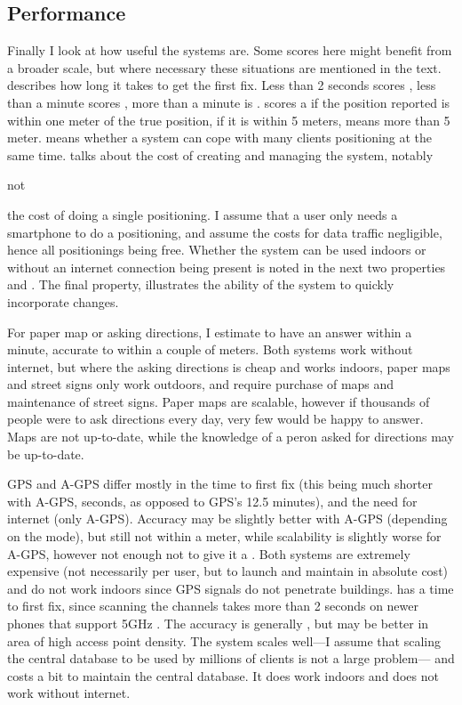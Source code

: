\subsection{Performance}
Finally I look at how useful the systems are.
Some scores here might benefit from a broader scale, but where necessary these situations are mentioned in the text.
 describes how long it takes to get the first fix.
Less than 2 seconds scores \yes, less than a minute scores \maybe, more than a minute is \no.
 scores a \yes if the position reported is within one meter of the true position, \maybe if it is within 5 meters, \no means more than 5 meter.
 means whether a system can cope with many clients positioning at the same time.
 talks about the cost of creating and managing the system, notably \begin{em}not\end{em} the cost of doing a single positioning.
I assume that a user only needs a smartphone to do a positioning, and assume the costs for data traffic negligible, hence all positionings being free.
Whether the system can be used indoors or without an internet connection being present is noted in the next two properties  and .
The final property,  illustrates the ability of the system to quickly incorporate changes.

For paper map or asking directions, I estimate to have an answer within a minute, accurate to within a couple of meters.
Both systems work without internet, but where the asking directions is cheap and works indoors, paper maps and street signs only work outdoors, and require purchase of maps and maintenance of street signs.
Paper maps are scalable, however if thousands of people were to ask directions every day, very few would be happy to answer.
Maps are not up-to-date, while the knowledge of a peron asked for directions may be up-to-date.

GPS and A-GPS differ mostly in the time to first fix (this being much shorter with A-GPS, seconds, as opposed to GPS's 12.5 minutes), and the need for internet (only A-GPS).
Accuracy may be slightly better with A-GPS (depending on the mode), but still not within a meter, while scalability is slightly worse for A-GPS, however not enough not to give it a \no.
Both systems are extremely expensive (not necessarily per user, but to launch and maintain in absolute cost) and do not work indoors since GPS signals do not penetrate buildings.
\Wifi has a \maybe time to first fix, since scanning the \wifi channels takes more than 2 seconds on newer phones that support 5GHz \wifi.
The accuracy is generally \no, but may be better in area of high access point density.
The system scales well---I assume that scaling the central database to be used by millions of clients is not a large problem--- and costs a bit to maintain the central database.
It does work indoors and does not work without internet.


